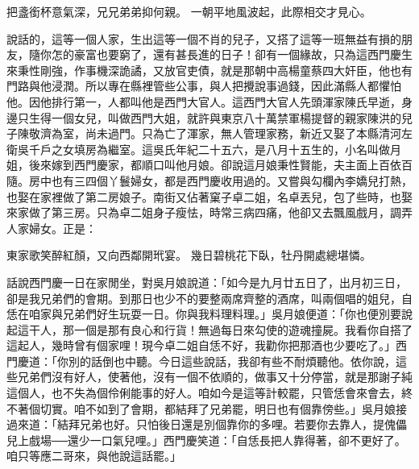 把盞銜杯意氣深，兄兄弟弟抑何親。
一朝平地風波起，此際相交才見心。


說話的，這等一個人家，生出這等一個不肖的兒子，又搭了這等一班無益有損的朋友，隨你怎的豪富也要窮了，還有甚長進的日子！卻有一個緣故，只為這西門慶生來秉性剛強，作事機深詭譎，又放官吏債，就是那朝中高楊童蔡四大奸臣，他也有門路與他浸潤。所以專在縣裡管些公事，與人把攪說事過錢，因此滿縣人都懼怕他。因他排行第一，人都叫他是西門大官人。這西門大官人先頭渾家陳氏早逝，身邊只生得一個女兒，叫做西門大姐，就許與東京八十萬禁軍楊提督的親家陳洪的兒子陳敬濟為室，尚未過門。只為亡了渾家，無人管理家務，新近又娶了本縣清河左衛吳千戶之女填房為繼室。這吳氏年紀二十五六，是八月十五生的，小名叫做月姐，後來嫁到西門慶家，都順口叫他月娘。卻說這月娘秉性賢能，夫主面上百依百隨。房中也有三四個丫鬟婦女，都是西門慶收用過的。又嘗與勾欄內李嬌兒打熱，也娶在家裡做了第二房娘子。南街又佔著窠子卓二姐，名卓丟兒，包了些時，也娶來家做了第三房。只為卓二姐身子瘦怯，時常三病四痛，他卻又去飄風戲月，調弄人家婦女。正是：

東家歌笑醉紅顏，又向西鄰開玳宴。
幾日碧桃花下臥，牡丹開處總堪憐。

話說西門慶一日在家閒坐，對吳月娘說道：「如今是九月廿五日了，出月初三日，卻是我兄弟們的會期。到那日也少不的要整兩席齊整的酒席，叫兩個唱的姐兒，自恁在咱家與兄弟們好生玩耍一日。你與我料理料理。」吳月娘便道：「你也便別要說起這干人，那一個是那有良心和行貨！無過每日來勾使的遊魂撞屍。我看你自搭了這起人，幾時曾有個家哩！現今卓二姐自恁不好，我勸你把那酒也少要吃了。」西門慶道：「你別的話倒也中聽。今日這些說話，我卻有些不耐煩聽他。依你說，這些兄弟們沒有好人，使著他，沒有一個不依順的，做事又十分停當，就是那謝子純這個人，也不失為個伶俐能事的好人。咱如今是這等計較罷，只管恁會來會去，終不著個切實。咱不如到了會期，都結拜了兄弟罷，明日也有個靠傍些。」吳月娘接過來道：「結拜兄弟也好。只怕後日還是別個靠你的多哩。若要你去靠人，提傀儡兒上戲場──還少一口氣兒哩。」西門慶笑道：「自恁長把人靠得著，卻不更好了。咱只等應二哥來，與他說這話罷。」

